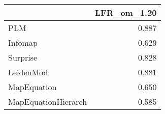 \begin{tabular}{lr}
\toprule
{} & LFR_om_1.20 \\
\midrule
PLM                 &       0.887 \\
Infomap             &       0.629 \\
Surprise            &       0.828 \\
LeidenMod           &       0.881 \\
MapEquation         &       0.650 \\
MapEquationHierarch &       0.585 \\
\bottomrule
\end{tabular}
